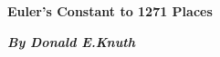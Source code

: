 \documentclass{article}
\title{}
\author{}
\date{}
\begin{document}
	\begin{center}
		\begin{minipage}{.96\linewidth}
			\begin{center}
				\Huge \textbf{Euler's Constant to 1271 Places}
			\end{center}
		\end{minipage}
		
		\begin{minipage}{.5\linewidth}
			\begin{center}
				\vspace{.5cm}
				\emph{\textbf{By Donald E.Knuth}}
			\end{center}
		\end{minipage}
	\end{center}
	\vspace{.1cm}
	
\end{document}
